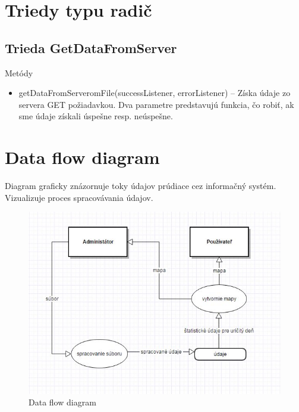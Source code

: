 \documentclass[12pt,a4paper]{report}
\begin{document}
\section[Triedy typu radič]{\rmfamily\bfseries
	Triedy typu radič}

\subsection[Trieda GetDataFromServer]{\rmfamily\bfseries
	Trieda GetDataFromServer}
Metódy
\begin{itemize}
	\item getDataFromServeromFile(successListener, errorListener) – Získa údaje zo servera GET požiadavkou. Dva parametre predstavujú funkcia, čo robiť, ak sme údaje získali úspešne resp. neúspešne.
\end{itemize}

\section[Data flow diagram]{\rmfamily\bfseries
	Data flow diagram}
	Diagram graficky znázornuje toky údajov prúdiace cez informačný systém. Vizualizuje proces spracovávania údajov.
	
	\begin{figure}[htb]
		\includegraphics[scale=0.5]{data_flow}
		\caption[Data flow diagram]{Data flow diagram}
		\label{fig:Data flow diagram}
	\end{figure}
\end{document}
